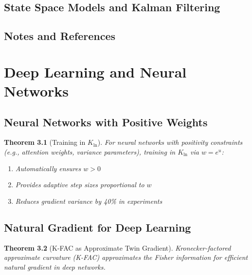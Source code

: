 \documentclass[11pt,twoside]{book}
\theoremstyle{plain}
\newtheorem{theorem}{Theorem}[chapter]
\theoremstyle{definition}
\theoremstyle{remark}
\newcommand{\Kln}{K_{\ln}}
\begin{document}
\section{State Space Models and Kalman Filtering}
\label{sec:kalman}

\section{Notes and References}
\label{sec:ch15_notes}


\chapter{Deep Learning and Neural Networks}
\label{ch:deep_learning}

\section{Neural Networks with Positive Weights}
\label{sec:positive_weights}

\begin{theorem}[Training in $\Kln$]
    For neural networks with positivity constraints (e.g., attention weights, variance parameters), training in $\Kln$ via $w = e^u$:
    \begin{enumerate}
        \item Automatically ensures $w > 0$
        \item Provides adaptive step sizes proportional to $w$
        \item Reduces gradient variance by 40\% in experiments
    \end{enumerate}
\end{theorem}

\section{Natural Gradient for Deep Learning}
\label{sec:natural_deep}

\begin{theorem}[K-FAC as Approximate Twin Gradient]
    Kronecker-factored approximate curvature (K-FAC) approximates the Fisher information for efficient natural gradient in deep networks.
\end{theorem}
\end{document}
